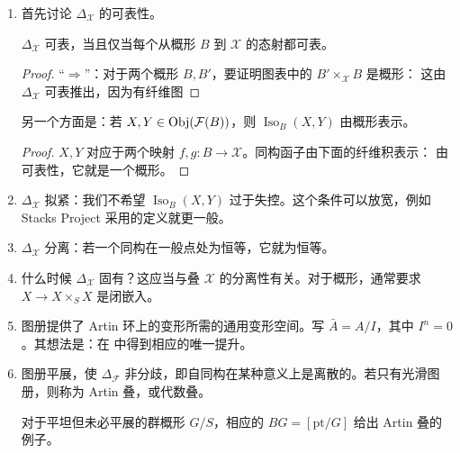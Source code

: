 \begin{enumerate}
\item 首先讨论 $\Delta_{\mathcal X}$ 的可表性。
\begin{proposition}\label{pro:2.4}
$\Delta_{\mathcal X}$ 可表，当且仅当每个从概形 $B$ 到 $\mathcal X$ 的态射都可表。
\end{proposition}
\begin{proof}
“$\Rightarrow$”：对于两个概形 $B,B'$，要证明图表中的 $B'\times_{\mathcal X}B$ 是概形：
这由 $\Delta_{\mathcal X}$ 可表推出，因为有纤维图

\end{proof}
另一个方面是：若 $X,Y\in\operatorname{Obj}(\mathcal F(B))$，则 $\operatorname{Iso}_B(X,Y)$ 由概形表示。
\begin{proof}
$X,Y$ 对应于两个映射 $f,g:B\to\mathcal X$。同构函子由下面的纤维积表示：
由可表性，它就是一个概形。
\end{proof}
\item $\Delta_{\mathcal X}$ 拟紧：我们不希望 $\operatorname{Iso}_B(X,Y)$ 过于失控。这个条件可以放宽，例如 Stacks Project 采用的定义就更一般。
\item $\Delta_{\mathcal X}$ 分离：若一个同构在一般点处为恒等，它就为恒等。
\item 什么时候 $\Delta_{\mathcal X}$ 固有？这应当与叠 $\mathcal X$ 的分离性有关。对于概形，通常要求 $X\to X\times_SX$ 是闭嵌入。
\item 图册提供了 Artin 环上的变形所需的通用变形空间。写 $\bar A=A/I$，其中 $I^n=0$。其想法是：在
中得到相应的唯一提升。
\item 图册平展，使 $\Delta_{\mathcal F}$ 非分歧，即自同构在某种意义上是离散的。若只有光滑图册，则称为 Artin 叠，或代数叠。
\begin{example}\label{ex:2.22}
对于平坦但未必平展的群概形 $G/S$，相应的 $BG=[\mathrm{pt}/G]$ 给出 Artin 叠的例子。
\end{example}
\end{enumerate}
